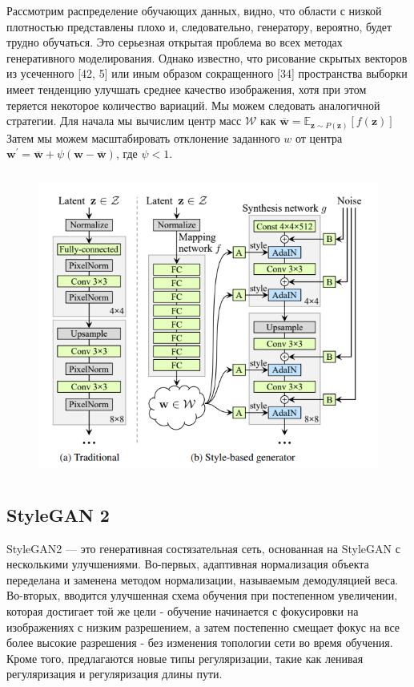 Рассмотрим распределение обучающих данных, видно, что области с низкой плотностью представлены плохо и, следовательно, генератору, вероятно, будет трудно обучаться. Это серьезная открытая проблема во всех методах генеративного моделирования. Однако известно, что рисование скрытых векторов из усеченного [42, 5] или иным образом сокращенного [34] пространства выборки имеет тенденцию улучшать среднее качество изображения, хотя при этом теряется некоторое количество вариаций.
Мы можем следовать аналогичной стратегии. Для начала мы вычислим центр масс $\mathcal{W}$ как $\overline{\mathbf{w}}=\mathbb{E}_{\mathbf{z} \sim P(\mathbf{z})}[f(\mathbf{z})]$
Затем мы можем масштабировать отклонение заданного $w$ от центра $\mathbf{w}^{\prime}=\overline{\mathbf{w}}+\psi(\mathbf{w}-\overline{\mathbf{w}})$, где $\psi < 1$.
\begin{figure}
    \centering
    \includegraphics[height=100mm]{fig/stylegan_scheme.png}
    \caption{}
    \label{fig.stylegan_scheme}
\end{figure}


\subsection{StyleGAN 2}
StyleGAN2 --- это генеративная состязательная сеть, основанная на StyleGAN с несколькими улучшениями. Во-первых, адаптивная нормализация объекта переделана и заменена методом нормализации, называемым демодуляцией веса. Во-вторых, вводится улучшенная схема обучения при постепенном увеличении, которая достигает той же цели - обучение начинается с фокусировки на изображениях с низким разрешением, а затем постепенно смещает фокус на все более высокие разрешения - без изменения топологии сети во время обучения. Кроме того, предлагаются новые типы регуляризации, такие как ленивая регуляризация и регуляризация длины пути.

